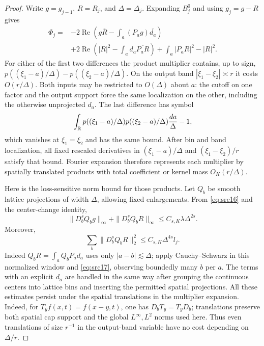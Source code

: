 \begin{proof}
Write $g=g_{j-1}$, $R=R_j$, and $\Delta=\Delta_j$.
Expanding $B_j^0$ and using $g_j=g-R$ gives
\begin{align*}
 \Phi_j={}&-2\operatorname{Re}\left(g\overline R-
                      \int_a(P_ag)\overline{d_a}\right)\\
 &+2\operatorname{Re}\left(|R|^2-
                      \int_ad_a\overline{P_aR}\right)
       +\int_a|P_aR|^2-|R|^2.
\end{align*}
For either of the first two differences the product multiplier
contains, up to sign,
$p((\xi_1-a)/\Delta)-p((\xi_2-a)/\Delta)$.
On the output band $|\xi_1-\xi_2|\asymp r$ it costs $O(r/\Delta)$.
Both inputs may be restricted to $O(\Delta)$ about $a$: the cutoff
on one factor and the output support force the same localization on
the other, including the otherwise unprojected $d_a$.
The last difference has symbol
\[
 \int_\mathbb R p((\xi_1-a)/\Delta)p((\xi_2-a)/\Delta)
                 \frac{da}{\Delta}-1,
\]
which vanishes at $\xi_1=\xi_2$ and has the same bound.
After bin and band localization, all fixed rescaled derivatives in
$(\xi_1-a)/\Delta$ and $(\xi_1-\xi_2)/r$ satisfy that bound.
Fourier expansion therefore represents each multiplier by spatially
translated products with total coefficient or kernel mass
$O_K(r/\Delta)$.

Here is the loss-sensitive norm bound for those products.
Let $Q_b$ be smooth lattice projections of width $\Delta$, allowing
fixed enlargements.  From \eqref{eq:src16} and the center-change
identity,
\[
 \|D_b^sQ_bg\|_\infty+
 \|D_b^sQ_bR\|_\infty\leq C_{s,K}\lambda\Delta^{2s}.
\]
Moreover,
\begin{equation}\label{eq:frame-loss-bins}
 \sum_b\|D_b^sQ_bR\|_2^2
 \leq C_{s,K}\Delta^{4s}l_j.
\end{equation}
Indeed $Q_bR=\int_aQ_bP_ad_a$ uses only $|a-b|\lesssim\Delta$;
apply Cauchy--Schwarz in this normalized window and
\eqref{eq:src17}, observing boundedly many $b$ per $a$.
The terms with an explicit $d_a$ are handled in the same way after
grouping the continuous centers into lattice bins and inserting the
permitted spatial projections.  All these estimates persist under
the spatial translations in the multiplier expansion.  Indeed, for
$T_yf(x,t)=f(x-y,t)$, one has $D_bT_y=T_yD_b$; translations preserve
both spatial cap support and the global $L^\infty,L^2$ norms used
here.  Thus even translations of size $r^{-1}$ in the output-band
variable have no cost depending on $\Delta/r$.


\end{proof}
